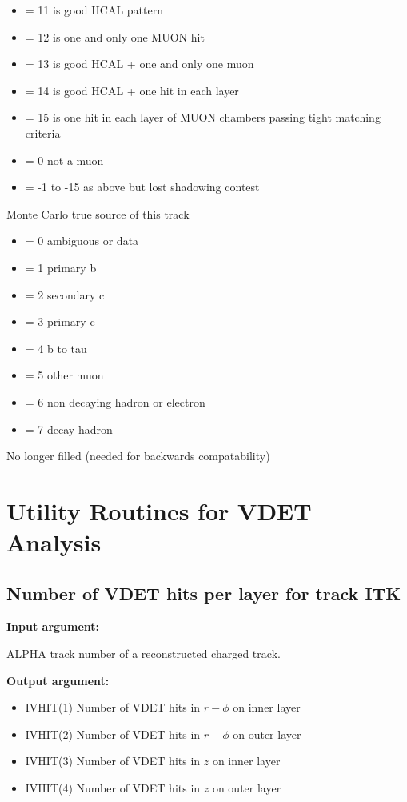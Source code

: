 \begin{indentlist}{ 3.50cm}{ 3.75cm}
\begin{itemize}
\item     = 11 is good HCAL pattern
\item     = 12 is one and only one MUON hit
\item     = 13 is good HCAL + one and only one muon
\item     = 14 is good HCAL + one hit in each layer
\item     = 15 is one hit in each layer of MUON chambers passing tight matching criteria
\item     = 0 not a muon
\item     = -1 to -15 as above but lost shadowing contest
\end{itemize}
     Monte Carlo true source of this track
\begin{itemize}
\item     = 0   ambiguous or data
\item     = 1   primary b
\item     = 2   secondary c
\item     = 3   primary c
\item     = 4   b to tau
\item     = 5   other muon
\item     = 6   non decaying hadron or electron
\item     = 7   decay hadron
\end{itemize}
      No longer filled (needed for backwards compatability)
\end{indentlist}
\par
\section{\label{sec-OARVDET}Utility Routines for VDET Analysis}
\par
\subsection{\label{sec-QVDHIT}Number of VDET hits per layer for track ITK}
\par
{}
\par
{\bf Input argument:}
\begin{indentlist}{ 3.50cm}{ 3.75cm}
ALPHA track number of a reconstructed charged track.
\end{indentlist}
\par
{\bf Output argument:}
\begin{indentlist}{ 3.50cm}{ 3.75cm}
\begin{itemize}
\item{IVHIT(1)} Number of VDET hits in $r-\phi$ on inner layer
\item{IVHIT(2)} Number of VDET hits in $r-\phi$ on outer layer
\item{IVHIT(3)} Number of VDET hits in $z$ on inner layer
\item{IVHIT(4)} Number of VDET hits in $z$ on outer layer
\end{itemize}
\end{indentlist}
\par
